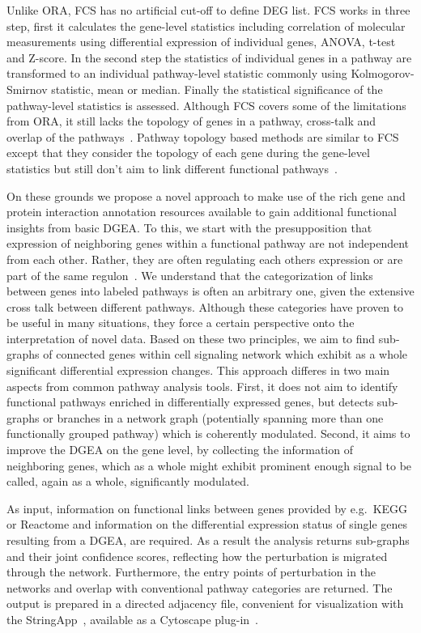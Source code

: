 \documentclass[10pt,a4paper,twocolumn]{article}
\begin{document}
Unlike ORA, FCS has no artificial cut-off to define DEG list. FCS
works in three step, first it calculates the gene-level statistics
including correlation of molecular measurements using differential
expression of individual genes, ANOVA, t-test and Z-score. In the
second step the statistics of individual genes in a pathway are
transformed to an individual pathway-level statistic commonly using
Kolmogorov-Smirnov statistic, mean or median. Finally the statistical
significance of the pathway-level statistics is assessed. Although FCS
covers some of the limitations from ORA, it still lacks the topology
of genes in a pathway, cross-talk and overlap of the
pathways~\cite{Khatri2012,Campos}. Pathway topology based methods are
similar to FCS except that they consider the topology of each gene
during the gene-level statistics but still don't aim to link different
functional pathways~\cite{Khatri2012}.

On these grounds we propose a novel approach to make use of the rich
gene and protein interaction annotation resources available to gain
additional functional insights from basic DGEA. To this, we start with
the presupposition that expression of neighboring genes within a
functional pathway are not independent from each other. Rather, they
are often regulating each others expression or are part of the same
regulon~\cite{Michalak}. We understand that the categorization of
links between genes into labeled pathways is often an arbitrary one,
given the extensive cross talk between different pathways. Although
these categories have proven to be useful in many situations, they
force a certain perspective onto the interpretation of novel
data. Based on these two principles, we aim to find sub-graphs of
connected genes within cell signaling network which exhibit as a whole
significant differential expression changes. This approach differes in
two main aspects from common pathway analysis tools. First, it does
not aim to identify functional pathways enriched in differentially
expressed genes, but detects sub-graphs or branches in a network graph
(potentially spanning more than one functionally grouped pathway)
which is coherently modulated. Second, it aims to improve the DGEA on
the gene level, by collecting the information of neighboring genes,
which as a whole might exhibit prominent enough signal to be called,
again as a whole, significantly modulated.

As input, information on functional links between genes provided by
e.g.~KEGG or Reactome and information on the differential expression
status of single genes resulting from a DGEA, are required. As a
result the analysis returns sub-graphs and their joint confidence
scores, reflecting how the perturbation is migrated through the
network. Furthermore, the entry points of perturbation in the networks
and overlap with conventional pathway categories are returned. The
output is prepared in a directed adjacency file, convenient for
visualization with the StringApp~\cite{StringApp}, available as a
Cytoscape plug-in~\cite{Cyto}.
\end{document}
